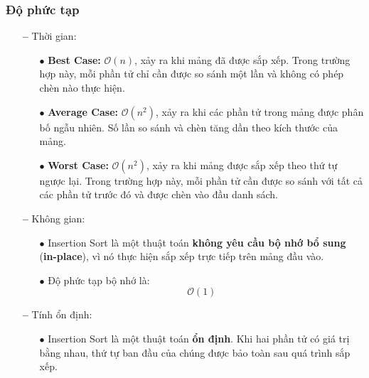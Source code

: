 \subsubsection{{Độ phức tạp}}
\begin{itemize}
    \item[\textbf{--}] {Thời gian:}
    \begin{itemize}
        \item[$\bullet$] \textbf{Best Case:} \(\mathcal{O}(n)\), xảy ra khi mảng đã được sắp xếp. Trong trường hợp này, mỗi phần tử chỉ cần được so sánh một lần và không có phép chèn nào thực hiện.
        \item[$\bullet$] \textbf{Average Case:} \(\mathcal{O}(n^2)\), xảy ra khi các phần tử trong mảng được phân bố ngẫu nhiên. Số lần so sánh và chèn tăng dần theo kích thước của mảng.
        \item[$\bullet$] \textbf{Worst Case:} \(\mathcal{O}(n^2)\), xảy ra khi mảng được sắp xếp theo thứ tự ngược lại. Trong trường hợp này, mỗi phần tử cần được so sánh với tất cả các phần tử trước đó và được chèn vào đầu danh sách.
    \end{itemize}
    \item[\textbf{--}] {Không gian:}
    \begin{itemize}
        \item[$\bullet$] Insertion Sort là một thuật toán \textbf{không yêu cầu bộ nhớ bổ sung} (\textbf{in-place}), vì nó thực hiện sắp xếp trực tiếp trên mảng đầu vào.
        \item[$\bullet$] Độ phức tạp bộ nhớ là:
        \[
        \mathcal{O}(1)
        \]
    \end{itemize}
    \item[\textbf{--}] {Tính ổn định:}
    \begin{itemize}
        \item[$\bullet$] Insertion Sort là một thuật toán \textbf{ổn định}. Khi hai phần tử có giá trị bằng nhau, thứ tự ban đầu của chúng được bảo toàn sau quá trình sắp xếp.
    \end{itemize}
\end{itemize}
